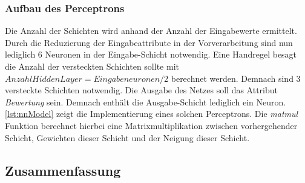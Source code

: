 \subsubsection{Aufbau des Perceptrons}
Die Anzahl der Schichten wird anhand der Anzahl der Eingabewerte ermittelt. 
Durch die Reduzierung der Eingabeattribute in der Vorverarbeitung sind nun lediglich 6 Neuronen in 
der Eingabe-Schicht notwendig. Eine Handregel besagt die Anzahl der versteckten Schichten sollte mit
$Anzahl Hidden Layer = Eingabeneuronen/2$ berechnet werden. Demnach sind 3 versteckte Schichten notwendig. 
Die Ausgabe des Netzes soll das Attribut \textit{Bewertung} sein. Demnach enthält die 
Ausgabe-Schicht lediglich ein Neuron.\\
\autoref{lst:nnModel} zeigt die Implementierung eines solchen Perceptrons. Die \textit{matmul} Funktion 
berechnet hierbei eine Matrixmultiplikation zwischen vorhergehender Schicht, Gewichten dieser Schicht und der Neigung dieser Schicht.


\subsection{Zusammenfassung}


